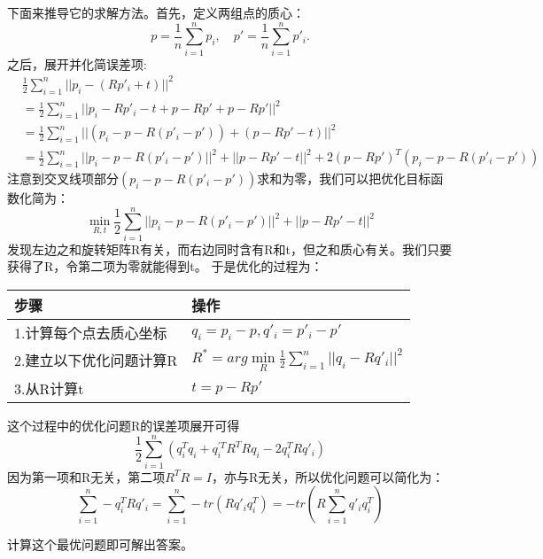 下面来推导它的求解方法。首先，定义两组点的质心：
\begin{equation}
    p = \frac{1}{n} \sum_{i=1}^n p_i, \quad p' = \frac{1}{n} \sum_{i=1}^n p'_i.
\end{equation}
之后，展开并化简误差项:
\[
\begin{split}
    & \frac{1}{2} \sum_{i=1}^{n} || p_i - (R p'_i + t) ||^2 \\
    &= \frac{1}{2} \sum_{i=1}^{n} || p_i - R p'_i - t + p - R p' + p - R p' ||^2 \\
    &= \frac{1}{2} \sum_{i=1}^{n} || (p_i - p - R(p'_i - p')) + (p - R p' - t) ||^2 \\
    &= \frac{1}{2} \sum_{i=1}^{n} || p_i - p - R(p'_i - p') ||^2 + || p - R p' - t ||^2 +  2 (p - R p')^T (p_i - p - R(p'_i - p'))
\end{split}
\]
注意到交叉线项部分$(p_i - p - R(p'_i - p') )$求和为零，我们可以把优化目标函数化简为：
\begin{equation}
    \min \limits_{R,t} \frac{1}{2} \sum_{i=1}^n || p_i - p - R(p'_i - p') ||^2 + || p - R p' - t ||^2
\end{equation}
发现左边之和旋转矩阵R有关，而右边同时含有R和t，但之和质心有关。我们只要获得了R，令第二项为零就能得到t。
于是优化的过程为：
\begin{center}
    \begin{tabular}{l l}
        \hline
        步骤 & 操作 \\
        \hline
        1.计算每个点去质心坐标 & $q_i = p_i - p , q'_i = p'_i - p'$ \\
        2.建立以下优化问题计算R & $R^* = arg \min \limits_{R} \frac{1}{2} \sum_{i=1}^n ||q_i - Rq'_i||^2$ \\
        3.从R计算t & $t = p - R p'$ \\
        \hline
    \end{tabular}
\end{center}
这个过程中的优化问题R的误差项展开可得
\begin{equation}
    \frac{1}{2} \sum_{i=1}^n (q_i^T q_i + q^{'T}_i R^T R q_i - 2 q_i^T R q'_i)
\end{equation}
因为第一项和R无关，第二项$R^T R = I$，亦与R无关，所以优化问题可以简化为：
\begin{equation}
    \sum_{i=1}^n -q_i^T R q'_i = \sum_{i=1}^n - tr(R q'_i q_i^T) = - tr(R \sum_{i=1}^n q'_i q_i^T)
\end{equation}

计算这个最优问题即可解出答案。
